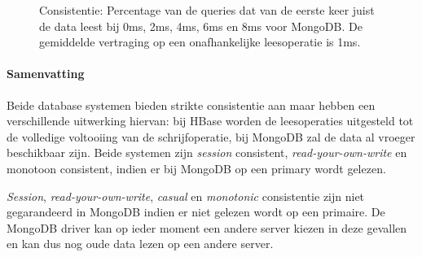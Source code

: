\begin{figure}[!htf]

\caption{Consistentie: Percentage van de queries dat van de eerste keer juist de data leest bij 0ms, 2ms, 4ms, 6ms en 8ms voor MongoDB. De gemiddelde vertraging op een onafhankelijke leesoperatie is 1ms. }
\label{fig:consistentie-mongodb-correct}
\end{figure}


\paragraph{Samenvatting} Beide database systemen bieden strikte consistentie aan maar hebben een verschillende uitwerking hiervan: bij HBase worden de leesoperaties uitgesteld tot de volledige voltooiing van de schrijfoperatie, bij MongoDB zal de data al vroeger beschikbaar zijn. Beide systemen zijn \textit{session} consistent, \textit{read-your-own-write} en monotoon consistent, indien er bij MongoDB op een primary wordt gelezen.  

\textit{Session}, \textit{read-your-own-write}, \textit{casual} en \textit{monotonic} consistentie zijn niet gegarandeerd in MongoDB indien er niet gelezen wordt op een primaire. De MongoDB driver kan op ieder moment een andere server kiezen in deze gevallen en kan dus nog oude data lezen op een andere server.

